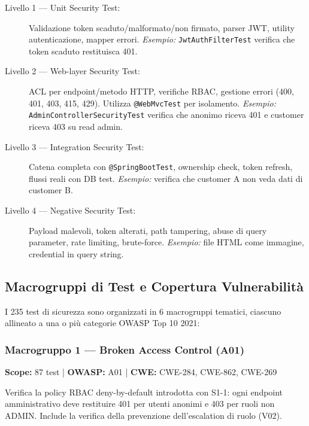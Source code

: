 \documentclass[12pt, a4paper]{article}
\begin{document}
    \begin{description}
        \item[Livello 1 — Unit Security Test:] Validazione token scaduto/malformato/non firmato,
        parser JWT, utility autenticazione, mapper errori. \textit{Esempio:} \texttt{JwtAuthFilterTest}
        verifica che token scaduto restituisca 401.

        \item[Livello 2 — Web-layer Security Test:] ACL per endpoint/metodo HTTP, verifiche RBAC,
        gestione errori (400, 401, 403, 415, 429). Utilizza \texttt{@WebMvcTest} per isolamento.
        \textit{Esempio:} \texttt{AdminControllerSecurityTest} verifica che anonimo riceva 401
        e customer riceva 403 su read admin.

        \item[Livello 3 — Integration Security Test:] Catena completa con \texttt{@SpringBootTest},
        ownership check, token refresh, flussi reali con DB test. \textit{Esempio:} verifica che
        customer A non veda dati di customer B.

        \item[Livello 4 — Negative Security Test:] Payload malevoli, token alterati, path tampering,
        abuse di query parameter, rate limiting, brute-force. \textit{Esempio:} file HTML come immagine,
        credential in query string.
    \end{description}

    \subsection{Macrogruppi di Test e Copertura Vulnerabilità}
    \label{subsec:security_test_groups}

    I 235 test di sicurezza sono organizzati in 6 macrogruppi tematici,
    ciascuno allineato a una o più categorie OWASP Top 10 2021:

    \subsubsection{Macrogruppo 1 — Broken Access Control (A01)}
    \label{subsubsec:group1_access_control}

    \textbf{Scope:} 87 test | \textbf{OWASP:} A01 | \textbf{CWE:} CWE-284, CWE-862, CWE-269

    Verifica la policy RBAC deny-by-default introdotta con S1-1: ogni endpoint
    amministrativo deve restituire 401 per utenti anonimi e 403 per ruoli non ADMIN.
    Include la verifica della prevenzione dell'escalation di ruolo (V02).
\end{document}

